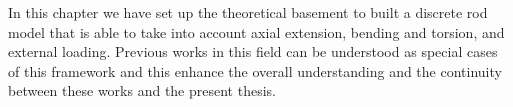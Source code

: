 In this chapter we have set up the theoretical basement to built a discrete rod model that is able to take into account axial extension, bending and torsion, and external loading. Previous works in this field can be understood as special cases of this framework and this enhance the overall understanding and the continuity between these works and the present thesis.

%
%
